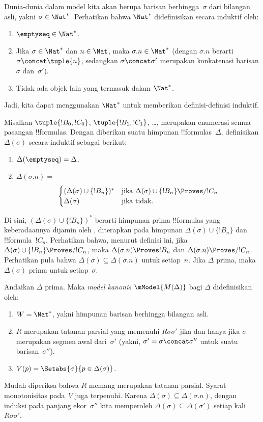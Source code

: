 \documentclass[../../../include/open-logic-section]{subfiles}
\begin{document}


Dunia-dunia dalam model kita akan berupa barisan berhingga~$\sigma$ dari
bilangan asli, yakni $\sigma\in\Nat^*$. Perhatikan bahwa $\Nat^*$
didefinisikan secara induktif oleh:
\begin{enumerate}
\item $\emptyseq \in \Nat^*$.
\item Jika $\sigma\in\Nat^*$ dan $n\in\Nat$, maka
  $\sigma.n\in\Nat^*$ (dengan $\sigma.n$ berarti
  $\sigma\concat\tuple{n}$, sedangkan $\sigma\concat\sigma'$ merupakan
  konkatenasi barisan $\sigma$ dan~$\sigma'$).
\item Tidak ada objek lain yang termasuk dalam $\Nat^*$.
\end{enumerate}
Jadi, kita dapat menggunakan $\Nat^*$ untuk memberikan definisi-definisi
induktif.

Misalkan $\tuple{!B_0,!C_0}$, $\tuple{!B_1,!C_1}$, \dots, merupakan
enumerasi semua pasangan !!{formula}s. Dengan diberikan suatu himpunan
!!{formula}s~$\Delta$, definisikan $\Delta(\sigma)$ secara induktif sebagai
berikut:
\begin{enumerate}
\item $\Delta(\emptyseq)=\Delta$.
\item $\Delta(\sigma.n)={}$
  \[
  \begin{cases}
    (\Delta(\sigma)\cup\{!B_n\})^* &
    \text{jika $\Delta(\sigma)\cup\{!B_n\}\Proves/ !C_n$} \\
    \Delta(\sigma) & \text{jika tidak}.
  \end{cases}
  \]
\end{enumerate}
Di sini, $(\Delta(\sigma)\cup\{!B_n\})^*$ berarti himpunan prima
!!{formula}s yang keberadaannya dijamin oleh
, diterapkan pada himpunan
$\Delta(\sigma)\cup\{!B_n\}$ dan !!{formula}~$!C_n$. Perhatikan bahwa,
menurut definisi ini, jika
$\Delta(\sigma)\cup\{!B_n\}\Proves/ !C_n$, maka
$\Delta(\sigma.n)\Proves !B_n$ dan
$\Delta(\sigma.n)\Proves/ !C_n$. Perhatikan pula bahwa
$\Delta(\sigma)\subseteq\Delta(\sigma.n)$ untuk setiap~$n$. Jika $\Delta$
prima, maka $\Delta(\sigma)$ prima untuk setiap~$\sigma$.

\begin{defn}
  Andaikan $\Delta$ prima. Maka \emph{model kanonis}
  $\mModel{M(\Delta)}$ bagi $\Delta$ didefinisikan oleh:
  \begin{enumerate}
  \item $W=\Nat^*$, yakni himpunan barisan berhingga bilangan asli.
  \item $R$ merupakan tatanan parsial yang memenuhi
    $R\sigma\sigma'$ jika dan hanya jika $\sigma$ merupakan segmen awal
    dari~$\sigma'$ (yakni, $\sigma'=\sigma\concat\sigma''$ untuk suatu
    barisan~$\sigma''$).
  \item $V(p)=\Setabs{\sigma}{p\in\Delta(\sigma)}$.
  \end{enumerate}
\end{defn}

Mudah diperiksa bahwa $R$ memang merupakan tatanan parsial. Syarat
monotonisitas pada~$V$ juga terpenuhi. Karena
$\Delta(\sigma)\subseteq\Delta(\sigma.n)$, dengan induksi pada panjang
ekor~$\sigma''$ kita memperoleh
$\Delta(\sigma)\subseteq\Delta(\sigma')$ setiap kali
$R\sigma\sigma'$.
\end{document}
